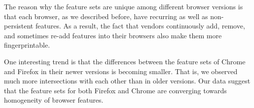 The reason why the feature sets are unique among different browser
versions is that each browser, as we described before, have recurring
as well as non-persistent features. As a result, the fact that vendors
continuously add, remove, and sometimes re-add features into their
browsers also make them more fingerprintable.


One interesting trend is that the differences between the feature sets
of Chrome and Firefox in their newer versions is becoming smaller.
That is, we observed much more intersections with each other than in
older versions. Our data suggest that the feature sets for both
Firefox and Chrome are converging towards homogeneity of browser
features.
